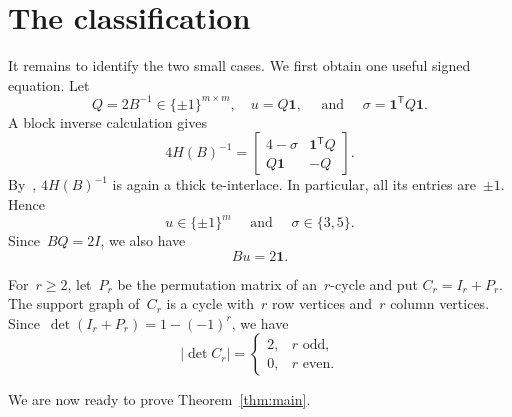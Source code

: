 \documentclass{amsart}
\numberwithin{equation}{section}
\newcommand{\one}{\mathbf 1}
\newcommand{\sfT}{\mathsf T}
\newcommand{\wideand}{ \quad \text{ and } \quad }
\begin{document}
\section{The classification} \label{sec:proof}

It remains to identify the two small cases.
We first obtain one useful signed equation.
Let
$$
    Q=2B^{-1}\in\{\pm1\}^{m\times m}, \quad u=Q\one, \wideand \sigma=\one^{\sfT}Q\one.
$$
A block inverse calculation gives
$$
    4H(B)^{-1}= \begin{bmatrix}
        4-\sigma&\one^{\sfT}Q\\
        Q\one&-Q
    \end{bmatrix}.
$$
By~\cite[Corollary 3.38]{Chervet_Grappe_Vallee_2026}, $4H(B)^{-1}$ is again a thick te-interlace.
In particular, all its entries are~$\pm1$.
Hence
\begin{equation}\label{eq:u-sigma}
    u\in\{\pm1\}^m \wideand \sigma\in\{3,5\}.
\end{equation}
Since~$BQ=2I$, we also have
\begin{equation}\label{eq:signed-degree}
    Bu=2\one.
\end{equation}

For~$r\geq2$, let~$P_r$ be the permutation matrix of an~$r$-cycle and put $C_r=I_r+P_r$.
The support graph of~$C_r$ is a cycle with~$r$ row vertices and~$r$ column vertices.
Since~$\det(I_r+P_r)=1-(-1)^r$, we have
\begin{equation}\label{eq:cycle-det}
    |\det C_r|= \begin{cases}
        2,&r\text{ odd},\\
        0,&r\text{ even}.
    \end{cases}
\end{equation}

We are now ready to prove Theorem~\ref{thm:main}.
\end{document}
